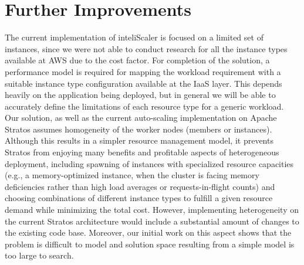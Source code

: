 \section{Further Improvements}
The current implementation of inteliScaler is focused on a limited set of instances, since we were not able to conduct research for all the instance types available at AWS due to the cost factor. For completion of the solution, a performance model is required for mapping the workload requirement with a suitable instance type configuration available at the IaaS layer. This depends heavily on the application being deployed, but in general we will be able to accurately define the limitations of each resource type for a generic workload.\\

Our solution, as well as the current auto-scaling implementation on Apache Stratos assumes homogeneity of the worker nodes (members or instances). Although this results in a simpler resource management model, it prevents Stratos from enjoying many benefits and profitable aspects of heterogeneous deployment, including spawning of instances with specialized resource capacities (e.g., a memory-optimized instance, when the cluster is facing memory deficiencies rather than high load averages or requests-in-flight counts) and choosing combinations of different instance types to fulfill a given resource demand while minimizing the total cost. However, implementing heterogeneity on the current Stratos architecture would include a substantial amount of changes to the existing code base. Moreover, our initial work on this aspect shows that the problem is difficult to model and solution space resulting from a simple model is too large to search.\\